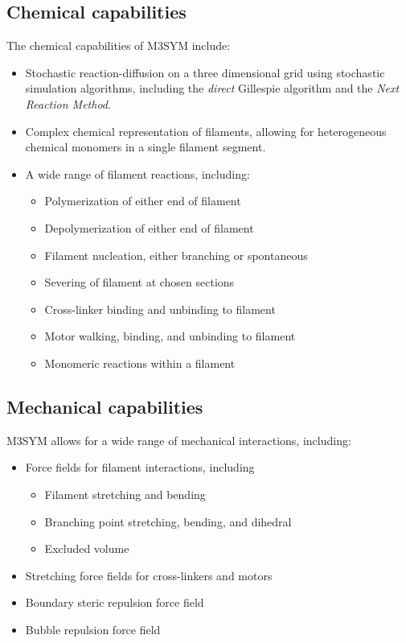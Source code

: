 \documentclass[11pt, oneside]{article}   	%
\begin{document}
\subsection{Chemical capabilities}
 The chemical capabilities of M3SYM include:

\begin{itemize}

\item Stochastic reaction-diffusion on a three dimensional grid using stochastic simulation algorithms, including the \textit{direct} Gillespie algorithm and the \textit{Next Reaction Method}.
\item Complex chemical representation of filaments, allowing for heterogeneous chemical monomers in a single filament segment.
\item A wide range of filament reactions, including:
\begin{itemize}
\item Polymerization of either end of filament
\item Depolymerization of either end of filament
\item Filament nucleation, either branching or spontaneous
\item Severing of filament at chosen sections
\item Cross-linker binding and unbinding to filament
\item Motor walking, binding, and unbinding to filament
\item Monomeric reactions within a filament

\end{itemize}
\end{itemize}

\subsection{Mechanical capabilities}
M3SYM allows for a wide range of mechanical interactions, including:

\begin{itemize}
\item Force fields for filament interactions, including
\begin{itemize}
\item Filament stretching and bending 
\item Branching point stretching, bending, and dihedral
\item Excluded volume 
\end{itemize}
\item Stretching force fields for cross-linkers and motors 
\item Boundary steric repulsion force field
\item Bubble repulsion force field
\end{itemize}
\end{document}
